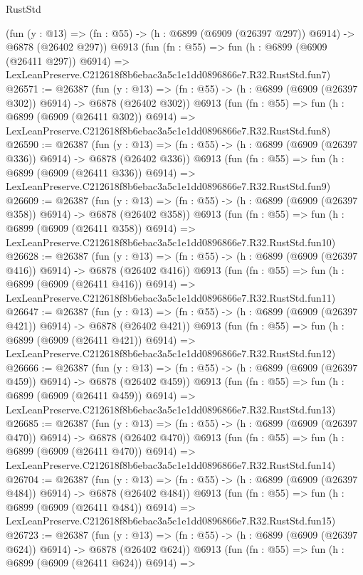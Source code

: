 \begin{lexlean}{RustStd}
\begin{coremodule}
    (fun (y : @13) => (fn : @55) -> (h : @6899 (@6909 (@26397 @297)) @6914) -> @6878 (@26402 @297))
    @6913
    (fun (fn : @55) =>
    fun (h : @6899 (@6909 (@26411 @297)) @6914) =>
    LexLeanPreserve.C212618f8b6ebac3a5c1e1dd0896866e7.R32.RustStd.fun7)
@26571 := @26387
    (fun (y : @13) => (fn : @55) -> (h : @6899 (@6909 (@26397 @302)) @6914) -> @6878 (@26402 @302))
    @6913
    (fun (fn : @55) =>
    fun (h : @6899 (@6909 (@26411 @302)) @6914) =>
    LexLeanPreserve.C212618f8b6ebac3a5c1e1dd0896866e7.R32.RustStd.fun8)
@26590 := @26387
    (fun (y : @13) => (fn : @55) -> (h : @6899 (@6909 (@26397 @336)) @6914) -> @6878 (@26402 @336))
    @6913
    (fun (fn : @55) =>
    fun (h : @6899 (@6909 (@26411 @336)) @6914) =>
    LexLeanPreserve.C212618f8b6ebac3a5c1e1dd0896866e7.R32.RustStd.fun9)
@26609 := @26387
    (fun (y : @13) => (fn : @55) -> (h : @6899 (@6909 (@26397 @358)) @6914) -> @6878 (@26402 @358))
    @6913
    (fun (fn : @55) =>
    fun (h : @6899 (@6909 (@26411 @358)) @6914) =>
    LexLeanPreserve.C212618f8b6ebac3a5c1e1dd0896866e7.R32.RustStd.fun10)
@26628 := @26387
    (fun (y : @13) => (fn : @55) -> (h : @6899 (@6909 (@26397 @416)) @6914) -> @6878 (@26402 @416))
    @6913
    (fun (fn : @55) =>
    fun (h : @6899 (@6909 (@26411 @416)) @6914) =>
    LexLeanPreserve.C212618f8b6ebac3a5c1e1dd0896866e7.R32.RustStd.fun11)
@26647 := @26387
    (fun (y : @13) => (fn : @55) -> (h : @6899 (@6909 (@26397 @421)) @6914) -> @6878 (@26402 @421))
    @6913
    (fun (fn : @55) =>
    fun (h : @6899 (@6909 (@26411 @421)) @6914) =>
    LexLeanPreserve.C212618f8b6ebac3a5c1e1dd0896866e7.R32.RustStd.fun12)
@26666 := @26387
    (fun (y : @13) => (fn : @55) -> (h : @6899 (@6909 (@26397 @459)) @6914) -> @6878 (@26402 @459))
    @6913
    (fun (fn : @55) =>
    fun (h : @6899 (@6909 (@26411 @459)) @6914) =>
    LexLeanPreserve.C212618f8b6ebac3a5c1e1dd0896866e7.R32.RustStd.fun13)
@26685 := @26387
    (fun (y : @13) => (fn : @55) -> (h : @6899 (@6909 (@26397 @470)) @6914) -> @6878 (@26402 @470))
    @6913
    (fun (fn : @55) =>
    fun (h : @6899 (@6909 (@26411 @470)) @6914) =>
    LexLeanPreserve.C212618f8b6ebac3a5c1e1dd0896866e7.R32.RustStd.fun14)
@26704 := @26387
    (fun (y : @13) => (fn : @55) -> (h : @6899 (@6909 (@26397 @484)) @6914) -> @6878 (@26402 @484))
    @6913
    (fun (fn : @55) =>
    fun (h : @6899 (@6909 (@26411 @484)) @6914) =>
    LexLeanPreserve.C212618f8b6ebac3a5c1e1dd0896866e7.R32.RustStd.fun15)
@26723 := @26387
    (fun (y : @13) => (fn : @55) -> (h : @6899 (@6909 (@26397 @624)) @6914) -> @6878 (@26402 @624))
    @6913
    (fun (fn : @55) =>
    fun (h : @6899 (@6909 (@26411 @624)) @6914) =>

\end{coremodule}
\end{lexlean}
